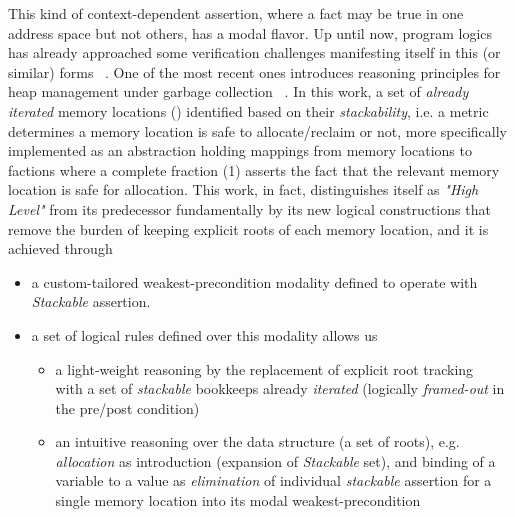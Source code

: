 This kind of context-dependent assertion, where a fact may be true in one address space but not others, has a modal flavor. Up until now, program logics ~\cite{} has already approached some verification challenges manifesting itself in this (or similar) forms ~\cite{}. One of the most recent ones introduces reasoning principles for heap management under garbage collection ~\cite{}. In this work, a set of \textit{already iterated} memory locations () identified based on their \textit{stackability}, i.e. a metric determines a memory location is safe to allocate/reclaim or not, more specifically implemented as an abstraction holding mappings from memory locations to factions where a complete fraction (1) asserts the fact that the relevant memory location is safe for allocation. This work, in fact, distinguishes itself as \textit{"High Level"} from its predecessor fundamentally by its new logical constructions that remove the burden of keeping explicit roots of each memory location, and it is achieved through ~\cite{}
\begin{itemize}
\item a custom-tailored weakest-precondition modality defined to operate with \textit{Stackable} assertion.
\item a set of logical rules defined over this modality allows us
  \begin{itemize}
  \item  a light-weight reasoning by the replacement of explicit root tracking ~\cite{} with a set of \textit{stackable} bookkeeps already \textit{iterated} (logically \textit{framed-out} in the pre/post condition)  
  \item  an intuitive reasoning over the data structure (a set of roots), e.g. \textit{allocation} as introduction (expansion of \textit{Stackable} set), and binding of a variable to a value as \textit{elimination} of individual \textit{stackable} assertion for a single memory location into its modal weakest-precondition
  \end{itemize}
\end{itemize}

